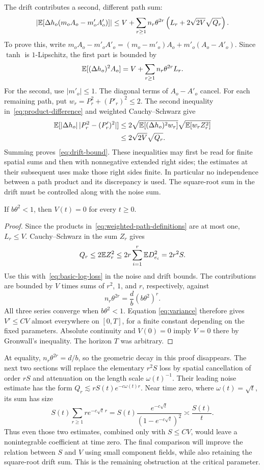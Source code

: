 The drift contributes a second, different path sum:
\begin{equation}\label{eq:drift-bound}
 \left|\mathbb E[\Delta h_o(m_oA_o-m'_oA'_o)]\right|
 \le V+\sum_{r\ge1}n_r\theta^{2r}
          \left(L_r+2\sqrt{2V}\sqrt{Q_r}\right).
\end{equation}
To prove this, write
$m_oA_o-m'_oA'_o=(m_o-m'_o)A_o+m'_o(A_o-A'_o)$.
Since $\tanh$ is $1$-Lipschitz, the first part is bounded by
\[
 \mathbb E[(\Delta h_o)^2A_o]
       =V+\sum_{r\ge1}n_r\theta^{2r}L_r.
\]
For the second, use $|m'_o|\le1$. The diagonal terms of $A_o-A'_o$
cancel. For each remaining path, put $w_r=P_r^2+(P'_r)^2\le2$.
The second inequality in~\eqref{eq:product-difference} and weighted
Cauchy--Schwarz give
\begin{align*}
 \mathbb E[|\Delta h_o|\,|P_r^2-(P'_r)^2|]
 &\le2\sqrt{\mathbb E[(\Delta h_o)^2w_r]}
          \sqrt{\mathbb E[w_rZ_r^2]}\\
 &\le2\sqrt{2V}\sqrt{Q_r}.
\end{align*}
Summing proves~\eqref{eq:drift-bound}. These inequalities may first
be read for finite spatial sums and then with nonnegative extended
right sides; the estimates at their subsequent uses make those
right sides finite. In particular no independence between a path
product and its discrepancy is used. The square-root sum in the
drift must be controlled along with the noise sum.

\begin{proposition}
\label{prop:strict-uniqueness}
If $b\theta^2<1$, then $V(t)=0$ for every $t\ge0$.
\end{proposition}

\begin{proof}
Since the products in~\eqref{eq:weighted-path-definitions} are at
most one, $L_r\le V$. Cauchy--Schwarz in the sum $Z_r$ gives
\[
 Q_r\le2\mathbb E Z_r^2
       \le2r\sum_{i=1}^r\mathbb E D_{e_i}^2=2r^2S.
\]
Use this with~\eqref{eq:basic-log-loss} in the noise and drift
bounds. The contributions are bounded by $V$ times sums of
$r^2$, $1$, and $r$, respectively, against
\[
 n_r\theta^{2r}=\frac db(b\theta^2)^r.
\]
All three series converge when $b\theta^2<1$. Equation
\eqref{eq:variance} therefore gives $V'\le C V$ almost everywhere
on $[0,T]$, for a finite constant depending on the fixed parameters.
Absolute continuity and $V(0)=0$ imply $V=0$ there by Gronwall's
inequality. The horizon $T$ was arbitrary.
\end{proof}

At equality, $n_r\theta^{2r}=d/b$, so the geometric decay in this
proof disappears. The next two sections will replace the elementary
$r^2S$ loss by spatial cancellation of order $rS$ and attenuation
on the length scale $\omega(t)^{-1}$. Their leading noise estimate
has the form $Q_r\lesssim rS(t)e^{-c\omega(t)r}$. Near time zero,
where $\omega(t)=\sqrt t$, its sum has size
\[
 S(t)\sum_{r\ge1}r e^{-c\sqrt t\,r}
   =S(t)\frac{e^{-c\sqrt t}}{(1-e^{-c\sqrt t})^2}
   \asymp\frac{S(t)}{t}.
\]
Thus even those two estimates, combined only with $S\le CV$, would
leave a nonintegrable coefficient at time zero. The final comparison
will improve the relation between $S$ and $V$ using small component
fields, while also retaining the square-root drift sum. This is the
remaining obstruction at the critical parameter.
